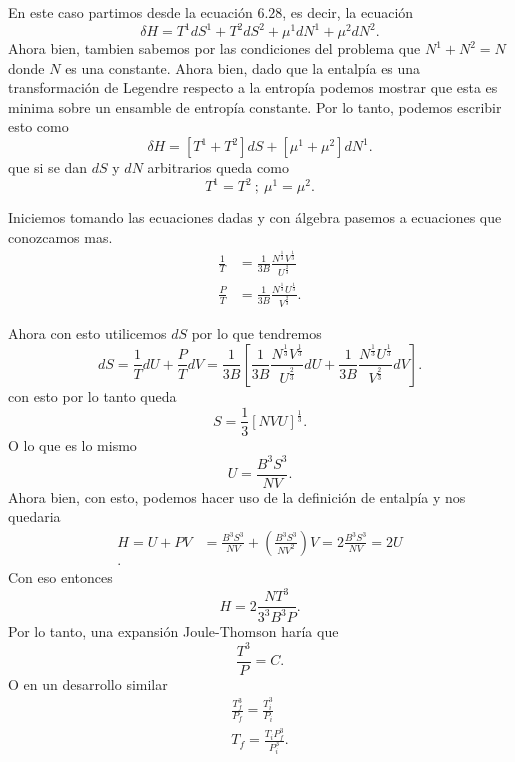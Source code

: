\documentclass{report}
\begin{document}
\sol

En este caso partimos desde la ecuación $6.28$, es decir, la ecuación \[
  \delta H = T^1dS^1 + T^2dS^2 + \mu^1dN^1+\mu^2dN^2
.\] Ahora bien, tambien sabemos por las condiciones del problema que $N^1 + N^2=N$ donde  $N$ es una constante. Ahora bien, dado que la entalpía es una transformación de Legendre respecto a la entropía podemos mostrar que esta es minima sobre un ensamble de entropía constante. Por lo tanto, podemos escribir esto como \[
\delta H = \left[ T^1+T^2 \right] dS + \left[ \mu^1 + \mu^2 \right] dN^1
.\] que si se dan $dS$ y $dN$ arbitrarios queda como \[
T^1=T^2\ ;\ \mu^1=\mu^2
.\] 


\sol

Iniciemos tomando las ecuaciones dadas y con álgebra pasemos a ecuaciones que conozcamos mas.
\begin{align*}
  \frac{1}{T}&=\frac{1}{3B}\frac{N^{\frac{1}{3}}V^{\frac{1}{3}}}{U^{\frac{2}{3}}}\\
  \frac{P}{T}&= \frac{1}{3B}\frac{N^{\frac{1}{3}}U^{\frac{1}{3}}}{V^{\frac{2}{3}}}
.\end{align*}

Ahora con esto utilicemos $dS$ por lo que tendremos \[
dS = \frac{1}{T}dU+\frac{P}{T}dV=\frac{1}{3B}\left[  \frac{1}{3B}\frac{N^{\frac{1}{3}}V^{\frac{1}{3}}}{U^{\frac{2}{3}}}dU+\frac{1}{3B}\frac{N^{\frac{1}{3}}U^{\frac{1}{3}}}{V^{\frac{2}{3}}}dV\right] 
.\] con esto por lo tanto queda \[
S=\frac{1}{3}\left[ NVU \right]^{\frac{1}{3}}
.\] O lo que es lo mismo \[
U = \frac{B^3S^3}{NV}
.\] Ahora bien, con esto, podemos hacer uso de la definición de entalpía y nos quedaria
\begin{align*}
  H=U+PV&=\frac{B^3S^3}{NV}+\left( \frac{B^3S^3}{NV^2} \right) V=2 \frac{B^3S^3}{NV}=2U\\
.\end{align*}
Con eso entonces \[
H=2 \frac{NT^3}{3^3B^3P}
.\] Por lo tanto, una expansión Joule-Thomson haría que \[
\frac{T^3}{P}=C
.\] O en un desarrollo similar
\begin{align*}
  \frac{T_f^3}{P_f}=\frac{T_i^3}{P_i}\\
  T_f = \frac{T_iP_f^3}{P_i^3}
.\end{align*}
\end{document}
